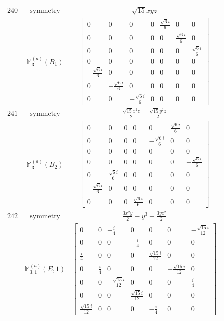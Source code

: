 \documentclass[fleqn,8pt,landscape]{jsarticle}
\begin{document}
\begin{longtable}{ccc}
$ 240 $ & $ \text{symmetry} $ & $ \sqrt{15} x y z $ \\
$  $ & $ \mathbb{M}_{3}^{(a)}(B_{1}) $ & $ \begin{bmatrix} 0 & 0 & 0 & 0 & \frac{\sqrt{6} i}{6} & 0 & 0 \\ 0 & 0 & 0 & 0 & 0 & \frac{\sqrt{6} i}{6} & 0 \\ 0 & 0 & 0 & 0 & 0 & 0 & \frac{\sqrt{6} i}{6} \\ 0 & 0 & 0 & 0 & 0 & 0 & 0 \\ - \frac{\sqrt{6} i}{6} & 0 & 0 & 0 & 0 & 0 & 0 \\ 0 & - \frac{\sqrt{6} i}{6} & 0 & 0 & 0 & 0 & 0 \\ 0 & 0 & - \frac{\sqrt{6} i}{6} & 0 & 0 & 0 & 0 \end{bmatrix} $ \\ \hline
$ 241 $ & $ \text{symmetry} $ & $ \frac{\sqrt{15} x^{2} z}{2} - \frac{\sqrt{15} y^{2} z}{2} $ \\
$  $ & $ \mathbb{M}_{3}^{(a)}(B_{2}) $ & $ \begin{bmatrix} 0 & 0 & 0 & 0 & 0 & \frac{\sqrt{6} i}{6} & 0 \\ 0 & 0 & 0 & 0 & - \frac{\sqrt{6} i}{6} & 0 & 0 \\ 0 & 0 & 0 & 0 & 0 & 0 & 0 \\ 0 & 0 & 0 & 0 & 0 & 0 & - \frac{\sqrt{6} i}{6} \\ 0 & \frac{\sqrt{6} i}{6} & 0 & 0 & 0 & 0 & 0 \\ - \frac{\sqrt{6} i}{6} & 0 & 0 & 0 & 0 & 0 & 0 \\ 0 & 0 & 0 & \frac{\sqrt{6} i}{6} & 0 & 0 & 0 \end{bmatrix} $ \\ \hline
$ 242 $ & $ \text{symmetry} $ & $ \frac{3 x^{2} y}{2} - y^{3} + \frac{3 y z^{2}}{2} $ \\
$  $ & $ \mathbb{M}_{3,1}^{(a)}(E,1) $ & $ \begin{bmatrix} 0 & 0 & - \frac{i}{4} & 0 & 0 & 0 & - \frac{\sqrt{15} i}{12} \\ 0 & 0 & 0 & - \frac{i}{4} & 0 & 0 & 0 \\ \frac{i}{4} & 0 & 0 & 0 & \frac{\sqrt{15} i}{12} & 0 & 0 \\ 0 & \frac{i}{4} & 0 & 0 & 0 & - \frac{\sqrt{15} i}{12} & 0 \\ 0 & 0 & - \frac{\sqrt{15} i}{12} & 0 & 0 & 0 & \frac{i}{4} \\ 0 & 0 & 0 & \frac{\sqrt{15} i}{12} & 0 & 0 & 0 \\ \frac{\sqrt{15} i}{12} & 0 & 0 & 0 & - \frac{i}{4} & 0 & 0 \end{bmatrix} $ \\ \hline

\end{longtable}
\end{document}
